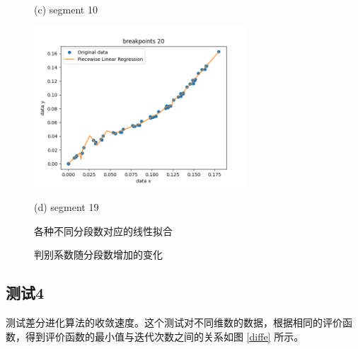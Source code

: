 \begin{figure}[H]
\begin{minipage}{0.48\linewidth}
      \centerline{(c) segment 10}
    \end{minipage}
    \hfill
    \begin{minipage}{0.48\linewidth}
      \centerline{\includegraphics[width=8.0cm]{./figure/chapter6/test3/segment19.png}}
      \centerline{(d) segment 19}
    \end{minipage}
    \caption{各种不同分段数对应的线性拟合}
    \label{test3}
\end{figure}

\begin{figure}[H]
    \caption{判别系数随分段数增加的变化}
    \label{r_squares}      
\end{figure}

\subsection{测试4\label{test4}}

测试差分进化算法的收敛速度。这个测试对不同维数的数据，根据相同的评价函数，得到评价函数的最小值与迭代次数之间的关系如图 \ref{diffe} 所示。

